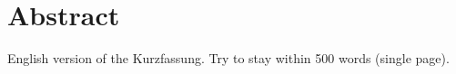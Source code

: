 \chapter*{Abstract}
\label{ch:Abstract}
English version of the Kurzfassung. Try to stay within 500 words (single page).
